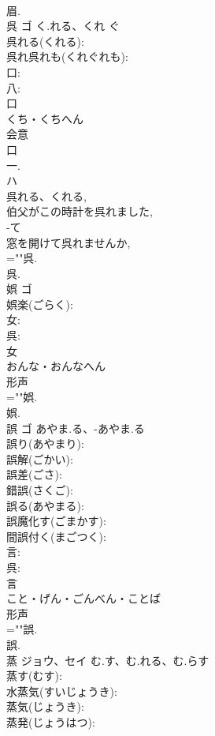 \documentclass[8pt]{extreport}
\begin{document}
\begin{CJK}{UTF8}{min}
\\	眉.
\\	呉	ゴ	く.れる、くれ	ぐ	
\\	呉れる(くれる): 
\\	呉れ呉れも(くれぐれも): 
\\	口: 
\\	八: 
\\	口	
\\	くち・くちへん	
\\	会意 
\\	口 
\\	一. 
\\	ハ 
\\	呉れる、くれる, 
\\	伯父がこの時計を呉れました, 
\\	-て 
\\	窓を開けて呉れませんか, 
\\	=""呉.
\\	呉.
\\	娯	ゴ			
\\	娯楽(ごらく): 
\\	女: 
\\	呉: 
\\	女	
\\	おんな・おんなへん	
\\	形声 
\\	=""娯.
\\	娯.
\\	誤	ゴ	あやま.る、-あやま.る		
\\	誤り(あやまり): 
\\	誤解(ごかい): 
\\	誤差(ごさ): 
\\	錯誤(さくご): 
\\	誤る(あやまる): 
\\	誤魔化す(ごまかす): 
\\	間誤付く(まごつく): 
\\	言: 
\\	呉: 
\\	言	
\\	こと・げん・ごんべん・ことば	
\\	形声 
\\	=""誤.
\\	誤.
\\	蒸	ジョウ、セイ	む.す、む.れる、む.らす		
\\	蒸す(むす): 
\\	水蒸気(すいじょうき): 
\\	蒸気(じょうき): 
\\	蒸発(じょうはつ): 

\end{CJK}
\end{document}
